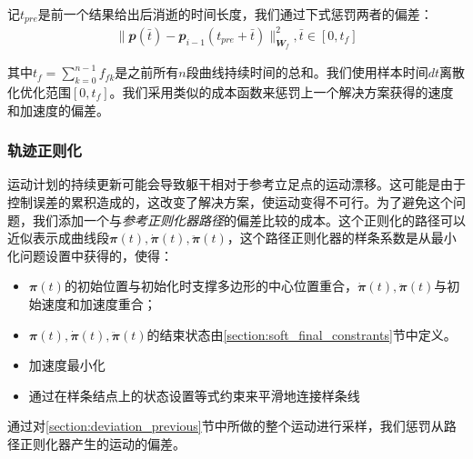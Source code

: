 记$t_{pre}$是前一个结果给出后消逝的时间长度，我们通过下式惩罚两者的偏差：
\begin{align}
    \|\mathbfit{p}(\bar t)-\mathbfit{p}_{i-1}(t_{pre}+\bar t)\|^2_{\mathbfit{W}_f}, \bar t \in[0, t_f]
\end{align}

其中$t_f=\sum_{k=0}^{n-1}f_{fk}$是之前所有$n$段曲线持续时间的总和。我们使用样本时间$dt$离散化优化范围$[0, t_f]$。我们采用类似的成本函数来惩罚上一个解决方案获得的速度和加速度的偏差。

\subsubsection{轨迹正则化}

运动计划的持续更新可能会导致躯干相对于参考立足点的运动漂移。这可能是由于控制误差的累积造成的，这改变了解决方案，使运动变得不可行。为了避免这个问题，我们添加一个与\emph{参考正则化器路径}的偏差比较的成本。这个正则化的路径可以近似表示成曲线段$\mathbfit{\pi}(t),\mathbfit{\dot \pi}(t), \mathbfit{\ddot \pi}(t)$，这个路径正则化器的样条系数是从最小化问题设置中获得的，使得：
\begin{itemize}
    \item $\mathbfit{\pi}(t)$的初始位置与初始化时支撑多边形的中心位置重合，$\mathbfit{\dot \pi}(t), \mathbfit{\ddot \pi}(t)$与初始速度和加速度重合；
    \item $\mathbfit{\pi}(t),\mathbfit{\dot \pi}(t), \mathbfit{\ddot \pi}(t)$的结束状态由\ref{section:soft_final_constrants}节中定义。
    \item 加速度最小化
    \item 通过在样条结点上的状态设置等式约束来平滑地连接样条线
\end{itemize}

通过对\ref{section:deviation_previous}节中所做的整个运动进行采样，我们惩罚从路径正则化器产生的运动的偏差。

    
